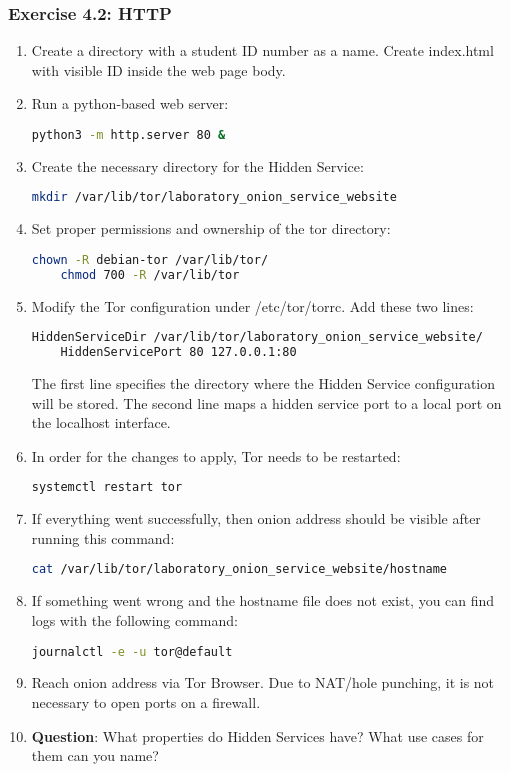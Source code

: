 \subsubsection{Exercise 4.2: HTTP}
\begin{enumerate}
    \item Create a directory with a student ID number as a name. Create index.html with visible ID inside the web page body.
    \item Run a python-based web server:
    \begin{lstlisting}[language=bash]
    python3 -m http.server 80 &
    \end{lstlisting}
    \item Create the necessary directory for the Hidden Service:
    \begin{lstlisting}[language=bash]
    mkdir /var/lib/tor/laboratory_onion_service_website
    \end{lstlisting}
    \item Set proper permissions and ownership of the tor directory:
    \begin{lstlisting}[language=bash]
    chown -R debian-tor /var/lib/tor/
    chmod 700 -R /var/lib/tor
    \end{lstlisting}
    \item Modify the Tor configuration under /etc/tor/torrc. Add these two lines:
    \begin{lstlisting}[language=bash]
    HiddenServiceDir /var/lib/tor/laboratory_onion_service_website/
    HiddenServicePort 80 127.0.0.1:80
    \end{lstlisting}
    The first line specifies the directory where the Hidden Service configuration will be stored. The second line maps a hidden service port to a local port on the localhost interface.
    \item In order for the changes to apply, Tor needs to be restarted:
    \begin{lstlisting}[language=bash]
    systemctl restart tor
    \end{lstlisting}
    \item If everything went successfully, then onion address should be visible after running this command:
    \begin{lstlisting}[language=bash]
    cat /var/lib/tor/laboratory_onion_service_website/hostname
    \end{lstlisting}
    \item If something went wrong and the hostname file does not exist, you can find logs with the following command:
    \begin{lstlisting}[language=bash]
    journalctl -e -u tor@default
    \end{lstlisting}
    \item Reach onion address via Tor Browser. Due to NAT/hole punching, it is not necessary to open ports on a firewall.
    \item \textbf{Question}: What properties do Hidden Services have? What use cases for them can you name?
\end{enumerate}

